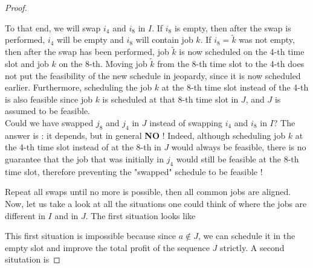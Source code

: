 \begin{proof}
\begin{tcolorbox}[title=\textbf{Example}]
To that end, we will swap $i_4$ and $i_8$ in $I$. If $i_8$ is empty, then after the swap is performed, $i_4$ will be empty and $i_8$ will contain job $k$. If $i_8 = \tilde{k}$ was not empty, then after the swap has been performed, job $\tilde{k}$ is now scheduled on the 4-th time slot and job $k$ on the 8-th. Moving job $\tilde{k}$ from the 8-th time slot to the 4-th does not put the feasibility of the new schedule in jeopardy, since it is now scheduled earlier. Furthermore, scheduling the job $k$ at the 8-th time slot instead of the 4-th is also feasible since job $k$ is scheduled at that 8-th time slot in $J$, and $J$ is assumed to be feasible. \\

Could we have swapped $j_8$ and $j_4$ in $J$ instead of swapping $i_4$ and $i_8$ in $I$? The answer is : it depends, but in general \textbf{NO} ! Indeed, although scheduling job $k$ at the 4-th time slot instead of at the 8-th in $J$ would always be feasible, there is no guarantee that the job that was initially in $j_4$ would still be feasible at the 8-th time slot, therefore preventing the "swapped" schedule to be feasible !
\end{tcolorbox}

Repeat all swaps until no more is possible, then all common jobs are aligned.
Now, let us take a look at all the situations one could think of where the jobs are different in $I$ and in $J$. The first situation looks like

\begin{figure}[h!]
\centering


\end{figure}

This first situation is impossible because since $a \notin J$, we can schedule it in the empty slot and improve the total profit of the sequence $J$ strictly. A second situtation is


\end{proof}
